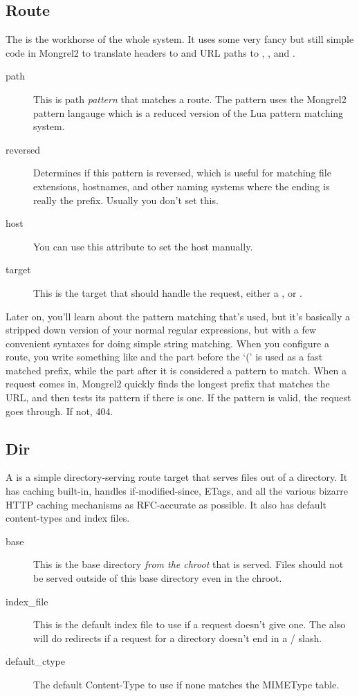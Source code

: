 \subsection{Route}

The  is the workhorse of the whole system.  It uses some very fancy but still simple
code in Mongrel2 to translate  headers to  and URL paths to ,
, and .

\begin{description}
\item[path] This is path \emph{pattern} that matches a route.  The pattern uses the Mongrel2 pattern langauge
    which is a reduced version of the Lua pattern matching system.
\item[reversed] Determines if this pattern is reversed, which is useful for matching file extensions, hostnames,
    and other naming systems where the ending is really the prefix.  Usually you don't set this.
\item[host] You can use this attribute to set the host manually.
\item[target] This is the target that should handle the request, either a ,  or .
\end{description}

Later on, you'll learn about the pattern matching that's used, but it's basically a stripped down version of your
normal regular expressions, but with a few convenient syntaxes for doing simple string matching.  When you configure
a route, you write something like  and the part before the `(' is used as a fast matched
prefix, while the part after it is considered a pattern to match.  When a request comes in, Mongrel2 quickly finds the
longest prefix that matches the URL, and then tests its pattern if there is one.  If the pattern is valid, the
request goes through.  If not, 404.


\subsection{Dir}

A  is a simple directory-serving route target that serves files out of a directory.  It has caching
built-in, handles if-modified-since, ETags, and all the various bizarre HTTP caching mechanisms as RFC-accurate
as possible.  It also has default content-types and index files.

\begin{description}
\item[base]  This is the base directory \emph{from the chroot} that is served.  Files should not
    be served outside of this base directory even in the chroot.
\item[index\_file] This is the default index file to use if a request doesn't give one.  The 
    also will do redirects if a request for a directory doesn't end in a / slash.
\item[default\_ctype] The default Content-Type to use if none matches the MIMEType table.
\end{description}

